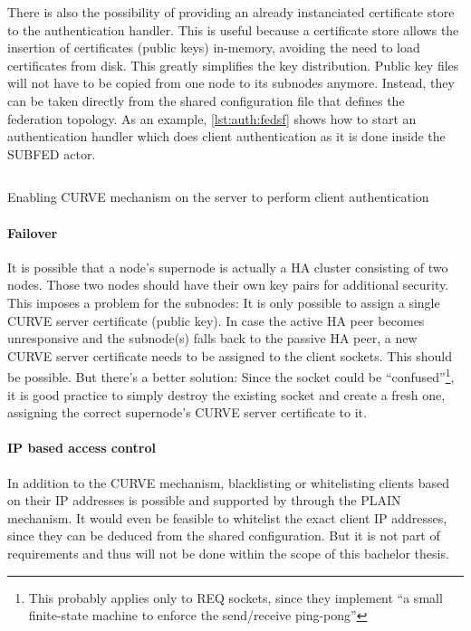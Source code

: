 There is also the possibility of providing an already instanciated certificate
store to the authentication handler. This is useful because a certificate store
allows the insertion of certificates (public keys) in-memory, avoiding the need
to load certificates from disk. This greatly simplifies the key distribution.
Public key files will not have to be copied from one node to its subnodes
anymore. Instead, they can be taken directly from the shared configuration file
that defines the federation topology. As an example, \autoref{lst:auth:fedsf}
shows how to start an authentication handler which does client authentication
as it is done inside the SUBFED actor.

\begin{listing}
	\inputminted[bgcolor=bg]{Ruby}{listings/auth/fedsf.rb}
	\caption{Enabling CURVE mechanism on the server to perform client authentication}
	\label{lst:auth:fedsf}
\end{listing}

\paragraph{Failover}\label{sec:approach:encryption:ha}
It is possible that a node's supernode is actually a HA cluster consisting of
two nodes. Those two nodes should have their own key pairs for additional
security. This imposes a problem for the subnodes: It is only possible to assign
a single CURVE server certificate (public key). In case the active HA peer becomes
unresponsive and the subnode(s) falls back to the passive HA peer, a new CURVE
server certificate needs to be assigned to the client sockets. This should be
possible. But there's a better solution:
Since the socket could be \cite[Binary Star Implementation, Binary Star client
in C]{zmq:zguide} ``confused''\footnote{This probably applies only to REQ
sockets, since they implement \cite[Client-Side Reliability (Lazy Pirate
Pattern)]{zmq:zguide} ``a small finite-state machine to enforce the
send/receive ping-pong''}, it is good practice to simply destroy the existing
socket and create a fresh one, assigning the correct supernode's CURVE server
certificate to it.

\paragraph{IP based access control}
In addition to the CURVE mechanism, blacklisting or whitelisting clients based
on their \gls{IP} addresses is possible and supported by
 through the PLAIN mechanism. It would even be
feasible to whitelist the exact client IP addresses, since they can be deduced
from the shared configuration. But it is not part of requirements and thus will not
be done within the scope of this bachelor thesis.

